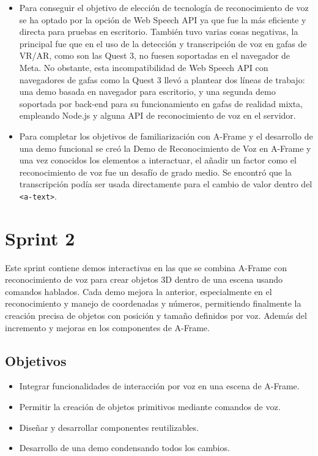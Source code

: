 \documentclass[a4paper, 12pt]{book}
\begin{document}
\begin{itemize}
  \setlength\parskip{0pt}    %
 \item Para conseguir el objetivo de elección de tecnología de reconocimiento de voz se ha optado por la opción de Web Speech API ya que fue la más eficiente y directa para pruebas en escritorio.
 También tuvo varias cosas negativas, la principal fue que en el uso de la detección y transcripción de voz en gafas de VR/AR, como son las Quest 3, no fuesen soportadas en el navegador de Meta.
 No obstante, esta incompatibilidad de Web Speech API con navegadores de gafas como la Quest 3 llevó a plantear dos líneas de trabajo: una demo basada en navegador para escritorio, y una segunda demo soportada por back-end para su funcionamiento en gafas de realidad mixta, empleando Node.js y alguna API de reconocimiento de voz en el servidor.
 \item Para completar los objetivos de familiarización con A-Frame y el desarrollo de una demo funcional se creó la
Demo de Reconocimiento de Voz en A-Frame y una vez conocidos los elementos a interactuar, el añadir un factor como el reconocimiento de voz fue un desafío de grado medio. Se encontró que la transcripción podía ser usada directamente para el cambio de valor dentro del \texttt{<a-text>}.
\end{itemize}


\section{Sprint 2}
\label{sec:sprint2}
Este sprint contiene demos interactivas en las que se combina A-Frame con reconocimiento de voz para crear objetos 3D dentro de una escena usando comandos hablados.
Cada demo mejora la anterior, especialmente en el reconocimiento y manejo de coordenadas y números, permitiendo finalmente la creación precisa de objetos con posición y tamaño definidos por voz.
Además del incremento y mejoras en los componentes de A-Frame.

\subsection{Objetivos}
\begin{itemize}
  \setlength\itemsep{0.3em}  %
  \item Integrar funcionalidades de interacción por voz en una escena de A-Frame.
  \item Permitir la creación de objetos primitivos mediante comandos de voz.
  \item Diseñar y desarrollar componentes reutilizables.
  \item Desarrollo de una demo condensando todos los cambios.
\end{itemize}
\end{document}

